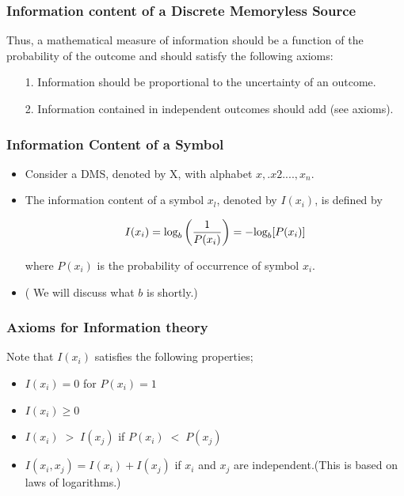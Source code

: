 \documentclass[a4]{beamer}
\begin{document}
\begin{frame}
\frametitle{Information content of a Discrete Memoryless Source}
Thus, a mathematical measure of information should be a function of the probability of the outcome and should satisfy the following axioms:
\begin{itemize}
\item[1.] Information should be proportional to the uncertainty of an outcome.
\item[2.] Information contained in independent outcomes should add (see axioms).
\end{itemize}
\end{frame}

\begin{frame}
\frametitle{Information Content of a Symbol}
\vspace{-1cm}
\begin{itemize}
\item Consider a DMS, denoted by X, with alphabet ${x,.x2. ...,x_n}$.
\item The information content of a symbol
$x_l$, denoted by $I(x_i)$, is defined by

\[  I(x_i)  = \mbox{log}_b\left({1 \over P(x_i)}\right) =  -\mbox{log}_b[ P(x_i) ]  \]


where $P(x_i)$ is the probability of occurrence of symbol $x_i$. \item ( We will discuss what $b$ is shortly.)
\end{itemize}
\end{frame}


\begin{frame}
\frametitle{Axioms for Information theory}
Note that $I(x_i)$ satisfies the following properties;
\begin{itemize}
\item $I(x_i) = 0 $ for $P(x_i) = 1$ %
\item $I(x_i) \geq 0 $
\item $I(x_i) \; >\; I(x_j)$  if $P(x_i)\; < \; P(x_j)$
\item $I(x_i, x_j)  = I(x_i) + I(x_j)$ if $x_i$ and $x_j$ are independent.(This is based on laws of logarithms.)
\end{itemize}
\end{frame}
\end{document}
